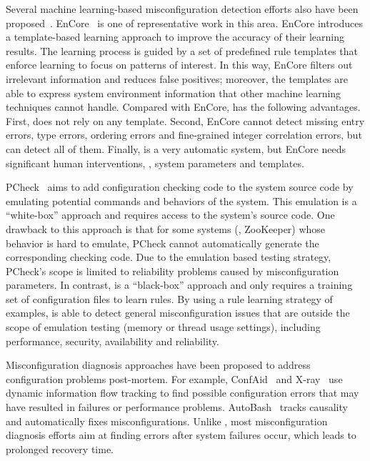 Several machine learning-based misconfiguration detection efforts 
also have been proposed~\cite{yuan11context, zhang14encore}.
EnCore~\cite{zhang14encore} is one of representative work in this area.
EnCore introduces a template-based
learning approach to improve the accuracy of their learning results.
The learning process is guided by a set of predefined rule templates
that enforce learning to focus on patterns of interest.
In this way, EnCore filters out irrelevant information and reduces
false positives; moreover, the templates are able to express
system environment information that other machine learning
techniques cannot handle.
Compared with EnCore, \app has the following advantages.
First, \app does not rely on any template. 
Second, EnCore cannot detect missing entry errors, type errors,
ordering errors and fine-grained integer correlation errors,
but \app can detect all of them.
Finally, \app is a very automatic system, but
EnCore needs significant human interventions, \eg, system parameters
and templates.

PCheck~\cite{xu16early} aims to add configuration checking code to the system source code by emulating potential commands and behaviors of the system. 
This emulation is a ``white-box'' approach and requires access to the system's source code.
One drawback to this approach is that for some systems (\eg, ZooKeeper) whose behavior is 
hard to emulate, PCheck cannot automatically generate the corresponding checking code.
Due to the emulation based testing strategy, PCheck's scope is limited to reliability problems caused by misconfiguration parameters. 
In contrast, \app is a ``black-box'' approach and only requires a training set of configuration files to learn rules.
By using a rule learning strategy of examples, \app is able to detect general misconfiguration issues that are outside the scope of emulation testing (\eg memory or thread usage settings), including performance, security, availability and reliability.

Misconfiguration diagnosis approaches have been proposed to address configuration problems post-mortem.
For example, ConfAid~\cite{attariyan10automating} 
and X-ray~\cite{attariyan12x-ray} use dynamic information
flow tracking to find possible configuration errors that may have resulted in
failures or performance problems. AutoBash~\cite{su07autobash} 
tracks causality and automatically fixes 
misconfigurations. Unlike \app, most misconfiguration
diagnosis efforts aim at finding errors after system
failures occur, which leads to prolonged recovery time.

